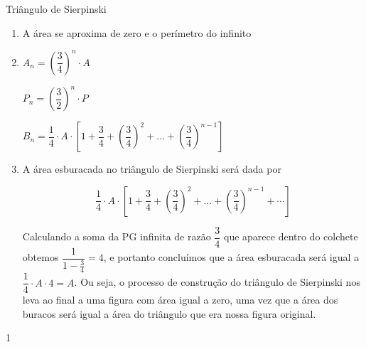 \begin{answer}{Triângulo de Sierpinski}
{
\begin{enumerate}
\item A área se aproxima de zero e o perímetro do infinito

\setcounter{enumi}{2}

\item{}
$A_n=\left(\dfrac{3}{4}\right)^n\cdot A$

$P_n=\left(\dfrac{3}{2}\right)^n\cdot P$

$B_n=\dfrac{1}{4}\cdot A \cdot \left[1+\dfrac{3}{4}+\left(\dfrac{3}{4}\right)^2+ \dots +\left(\dfrac{3}{4}\right)^{n-1}\right]$

\item{}
A área esburacada no triângulo de Sierpinski será dada por

\[
\dfrac{1}{4}\cdot A \cdot \left[1+\dfrac{3}{4}+\left(\dfrac{3}{4}\right)^2+ \dots +\left(\dfrac{3}{4}\right)^{n-1}+ \cdots \right]
\]

Calculando a soma da PG infinita de razão $\dfrac{3}{4}$ que aparece dentro do colchete obtemos $\dfrac{1}{1-\frac{3}{4}}=4$, e portanto concluímos que a área esburacada será igual a $\dfrac{1}{4}\cdot A \cdot 4 = A$. Ou seja, o processo de construção do triângulo de Sierpinski nos leva ao final a uma figura com área igual a zero, uma vez que a área dos buracos será igual a área do triângulo que era nossa figura original.

\end{enumerate}
}{1}
\end{answer}
